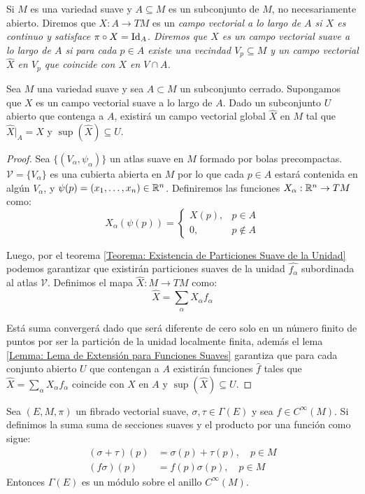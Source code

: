 \begin{definition}
  Si $M$ es una variedad suave y $A \subseteq M$ es un subconjunto de $M$, no necesariamente abierto. Diremos que $X: A \to TM$ es un \it{campo vectorial a lo largo de $A$} si $X$ es continuo y satisface $\pi \circ X = \mathrm{Id}_{A}$. Diremos que $X$ es un \it{campo vectorial suave a lo largo de $A$} si para cada $p \in A$ existe una vecindad $V_p \subseteq M$ y un campo vectorial $\hat{X}$ en $V_p$ que coincide con $X$ en $V \cap A$.
\end{definition}

\begin{lemma}
  Sea $M$ una variedad suave y sea $A \subset M$ un subconjunto cerrado. Supongamos que $X$ es un campo vectorial suave a lo largo de $A$. Dado un subconjunto $U$ abierto que contenga a $A$, existirá un campo vectorial global $\hat{X}$ en $M$ tal que $\hat{X}|_{A} = X$ y $\sup(\hat{X}) \subseteq U$.
\end{lemma}

\begin{proof}
  Sea $\{(V_\alpha,\psi_\alpha)\}$ un atlas suave en $M$ formado por bolas precompactas. $\mathcal{V}=\{V_\alpha\}$ es una cubierta abierta en $M$ por lo que cada $p \in A$ estará contenida en algún $V_\alpha$, y $\psi(p) = (x_1,\dots,x_n) \in \mathbb{R}^n$. Definiremos las funciones $X_\alpha: \mathbb{R}^n \to TM$ como:
  \[
    X_{\alpha}(\psi(p)) = \begin{cases}
      X(p), & p \in A\\
      0, & p \notin A
    \end{cases}
  \]

  Luego, por el teorema \ref{Teorema: Existencia de Particiones Suave de la Unidad} podemos garantizar que existirán particiones suaves de la unidad $\hat{f_\alpha}$ subordinada al atlas $\mathcal{V}$. Definimos el mapa $\hat{X}: M \to TM$ como:
  \[
    \hat{X} = \sum_{\alpha} X_{\alpha}f_\alpha
  \]

  Está suma convergerá dado que será diferente de cero solo en un número finito de puntos por ser la partición de la unidad localmente finita, además el lema \ref{Lemma: Lema de Extensión para Funciones Suaves} garantiza que para cada conjunto abierto $U$ que contengan a $A$ existirán funciones $\hat{f}$ tales que $\hat{X} = \sum_\alpha  X_\alpha f_\alpha$ coincide con $X$ en $A$ y $\sup(\hat{X}) \subseteq U$. 
\end{proof}

\begin{theorem}
  Sea $(E,M, \pi)$ un fibrado vectorial suave, $\sigma, \tau \in \Gamma(E)$ y sea $f \in C^{\infty}(M)$. Si definimos la suma suma de secciones suaves y el producto por una función como sigue:
\begin{align*}
  (\sigma + \tau)(p) &= \sigma(p) + \tau(p), \quad p \in M\\
  (f\sigma)(p) &= f(p)\sigma(p), \quad p \in M
\end{align*}
  Entonces $\Gamma(E)$ es un módulo sobre el anillo $C^{\infty}(M)$.
\end{theorem}

